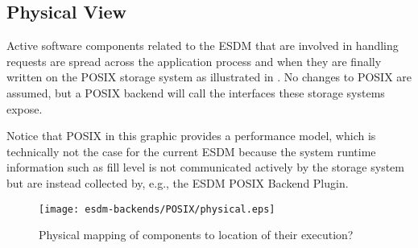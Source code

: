 \subsection{Physical View}

Active software components related to the ESDM that are involved in handling requests are spread across the application process and when they are finally written on the POSIX storage system as illustrated in .
No changes to POSIX are assumed, but a POSIX backend will call the interfaces these storage systems expose.

Notice that POSIX in this graphic provides a performance model, which is technically not the case for the current ESDM because the system runtime information such as fill level is not communicated actively by the storage system but are instead collected by, e.g., the ESDM POSIX Backend Plugin.


\begin{figure}
	\centering
	\texttt{[image: esdm-backends/POSIX/physical.eps]}
	\caption{Physical mapping of components to location of their execution?}
	\label{fig:backend posix physical view}
\end{figure}



%
%
%
%
%
%
%
%
%
